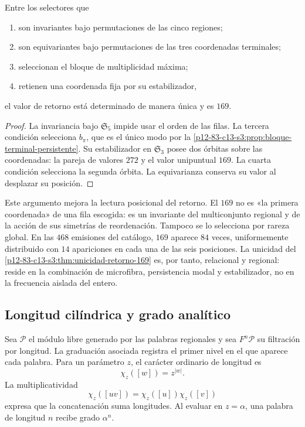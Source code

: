 \begin{theorem}
\label{p12-83-c13-s3:thm:unicidad-retorno-169}
Entre los selectores que
\begin{enumerate}
  \item son invariantes bajo permutaciones de las cinco regiones;
  \item son equivariantes bajo permutaciones de las tres coordenadas
  terminales;
  \item seleccionan el bloque de multiplicidad máxima;
  \item retienen una coordenada fija por su estabilizador,
\end{enumerate}
el valor de retorno está determinado de manera única y es \(169\).
\end{theorem}

\begin{proof}
La invariancia bajo \(\mathfrak S_5\) impide usar el orden de las filas. La
tercera condición selecciona \(b_\pi\), que es el único modo por la
\cref{p12-83-c13-s3:prop:bloque-terminal-persistente}. Su estabilizador en
\(\mathfrak S_3\) posee dos órbitas sobre las coordenadas: la pareja de
valores \(272\) y el valor unipuntual \(169\). La cuarta condición selecciona la
segunda órbita. La equivarianza conserva su valor al desplazar su posición.
\end{proof}

Este argumento mejora la lectura posicional del retorno. El \(169\) no es
«la primera coordenada» de una fila escogida: es un invariante del
multiconjunto regional y de la acción de sus simetrías de reordenación.
Tampoco se lo selecciona por rareza global. En las \(468\) emisiones del
catálogo, \(169\) aparece \(84\) veces, uniformemente distribuido con
\(14\) apariciones en cada una de las seis posiciones. La unicidad del
\cref{p12-83-c13-s3:thm:unicidad-retorno-169} es, por tanto, relacional y regional: reside
en la combinación de microfibra, persistencia modal y estabilizador, no en la
frecuencia aislada del entero.

\subsection{Longitud cilíndrica y grado analítico}

Sea \(\mathcal P\) el módulo libre generado por las palabras regionales y
sea \(F^n\mathcal P\) su filtración por longitud. La graduación asociada
registra el primer nivel en el que aparece cada palabra. Para un parámetro
\(z\), el carácter ordinario de longitud es
\[
\chi_z([w])=z^{|w|}.
\]
La multiplicatividad
\[
\chi_z([uv])=\chi_z([u])\chi_z([v])
\]
expresa que la concatenación suma longitudes. Al evaluar en
\(z=\alpha\), una palabra de longitud \(n\) recibe grado \(\alpha^n\).

